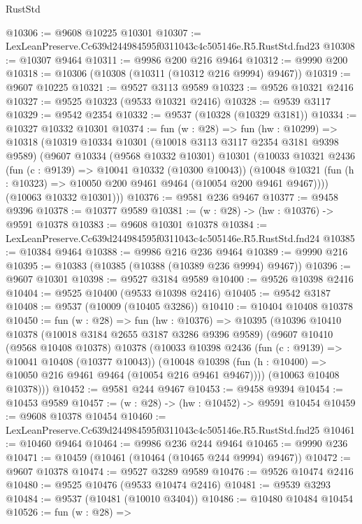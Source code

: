 \begin{lexlean}{RustStd}
\begin{coremodule}
@10306 := @9608 @10225 @10301
@10307 := LexLeanPreserve.Cc639d244984595f0311043c4c505146e.R5.RustStd.fnd23
@10308 := @10307 @9464
@10311 := @9986 @200 @216 @9464
@10312 := @9990 @200
@10318 := @10306 (@10308 (@10311 (@10312 @216 @9994) @9467))
@10319 := @9607 @10225
@10321 := @9527 @3113 @9589
@10323 := @9526 @10321 @2416
@10327 := @9525 @10323 (@9533 @10321 @2416)
@10328 := @9539 @3117
@10329 := @9542 @2354
@10332 := @9537 (@10328 (@10329 @3181))
@10334 := @10327 @10332 @10301
@10374 := fun (w : @28) =>
  fun (hw : @10299) =>
  @10318
    (@10319
      @10334
      @10301
      (@10018 @3113 @3117 @2354 @3181 @9398 @9589)
      (@9607
        @10334
        (@9568 @10332 @10301)
        @10301
        (@10033
          @10321
          @2436
          (fun (c : @9139) => @10041 @10332 (@10300 @10043))
          (@10048 @10321 (fun (h : @10323) => @10050 @200 @9461 @9464 (@10054 @200 @9461 @9467))))
        (@10063 @10332 @10301)))
@10376 := @9581 @236 @9467
@10377 := @9458 @9396
@10378 := @10377 @9589
@10381 := (w : @28) -> (hw : @10376) -> @9591 @10378
@10383 := @9608 @10301 @10378
@10384 := LexLeanPreserve.Cc639d244984595f0311043c4c505146e.R5.RustStd.fnd24
@10385 := @10384 @9464
@10388 := @9986 @216 @236 @9464
@10389 := @9990 @216
@10395 := @10383 (@10385 (@10388 (@10389 @236 @9994) @9467))
@10396 := @9607 @10301
@10398 := @9527 @3184 @9589
@10400 := @9526 @10398 @2416
@10404 := @9525 @10400 (@9533 @10398 @2416)
@10405 := @9542 @3187
@10408 := @9537 (@10009 (@10405 @3286))
@10410 := @10404 @10408 @10378
@10450 := fun (w : @28) =>
  fun (hw : @10376) =>
  @10395
    (@10396
      @10410
      @10378
      (@10018 @3184 @2655 @3187 @3286 @9396 @9589)
      (@9607
        @10410
        (@9568 @10408 @10378)
        @10378
        (@10033
          @10398
          @2436
          (fun (c : @9139) => @10041 @10408 (@10377 @10043))
          (@10048 @10398 (fun (h : @10400) => @10050 @216 @9461 @9464 (@10054 @216 @9461 @9467))))
        (@10063 @10408 @10378)))
@10452 := @9581 @244 @9467
@10453 := @9458 @9394
@10454 := @10453 @9589
@10457 := (w : @28) -> (hw : @10452) -> @9591 @10454
@10459 := @9608 @10378 @10454
@10460 := LexLeanPreserve.Cc639d244984595f0311043c4c505146e.R5.RustStd.fnd25
@10461 := @10460 @9464
@10464 := @9986 @236 @244 @9464
@10465 := @9990 @236
@10471 := @10459 (@10461 (@10464 (@10465 @244 @9994) @9467))
@10472 := @9607 @10378
@10474 := @9527 @3289 @9589
@10476 := @9526 @10474 @2416
@10480 := @9525 @10476 (@9533 @10474 @2416)
@10481 := @9539 @3293
@10484 := @9537 (@10481 (@10010 @3404))
@10486 := @10480 @10484 @10454
@10526 := fun (w : @28) =>

\end{coremodule}
\end{lexlean}
